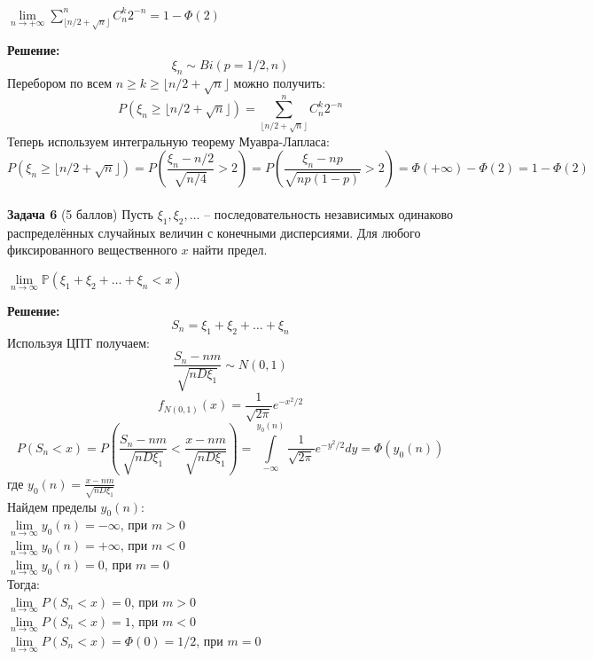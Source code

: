 \documentclass{article}
\newcommand\myp{\mathbb P}
\begin{document}
\begin{center}
    $\lim\limits_{n \to +\infty} \sum\limits_{\lfloor n/2 + \sqrt{n} \rfloor}^{n} C_n^k 2^{-n} = 1 - \Phi(2)$
\end{center}

\textbf{Решение:}\\
$$\xi_n \sim Bi(p=1/2, n)$$
Перебором по всем $n \geq k \geq \lfloor n/2 + \sqrt{n} \rfloor$ можно получить:\\
$$P(\xi_n \geq \lfloor n/2 + \sqrt{n} \rfloor) = \sum\limits_{\lfloor n/2 + \sqrt{n} \rfloor}^{n} C_n^k 2^{-n}$$
Теперь используем интегральную теорему Муавра-Лапласа:
$$P(\xi_n \geq \lfloor n/2 + \sqrt{n} \rfloor) = P(\frac{\xi_n - n/2}{\sqrt{n/4}} > 2) = P(\frac{\xi_n - np}{\sqrt{np(1-p)}} > 2)= \Phi(+\infty) - \Phi(2) = 1 - \Phi(2)$$\\

\textbf{Задача 6} (5 баллов)
Пусть $\xi_1, \xi_2, \dots$ -- последовательность независимых одинаково распределённых случайных величин с конечными дисперсиями. Для любого фиксированного вещественного $x$ найти предел.
\begin{center}
$\underset{n \to \infty}{\lim}\myp{(\xi_1 + \xi_2 + \dots + \xi_n < x)}$
\end{center}

\textbf{Решение:}\\
$$S_n = \xi_1 + \xi_2 + \dots + \xi_n$$
Используя ЦПТ получаем:\\
$$\frac{S_n - nm}{\sqrt{nD\xi_1}}\sim N(0,1)$$
$$f_{N(0,1)}(x) = \frac{1}{\sqrt{2\pi}}e^{-x^2/2}$$
$$P(S_n < x) = P(\frac{S_n - nm}{\sqrt{nD\xi_1}} < \frac{x - nm}{\sqrt{nD\xi_1}}) = \int\limits_{-\infty}^{y_0(n)} \frac{1}{\sqrt{2\pi}}e^{-y^2/2} dy = \Phi(y_0(n))$$
где $y_0(n) = \frac{x - nm}{\sqrt{nD\xi_1}}$\\
Найдем пределы $y_0(n)$:\\
$\underset{n \to \infty}{\lim} y_0(n) = -\infty$, при $m > 0$\\
$\underset{n \to \infty}{\lim} y_0(n) = +\infty$, при $m < 0$\\
$\underset{n \to \infty}{\lim} y_0(n) = 0$, при $m = 0$\\
Тогда:\\
$\underset{n \to \infty}{\lim} P(S_n < x) = 0$, при $m > 0$\\
$\underset{n \to \infty}{\lim} P(S_n < x) = 1$, при $m < 0$\\
$\underset{n \to \infty}{\lim} P(S_n < x) = \Phi(0) = 1/2$, при $m = 0$\\
\end{document}
